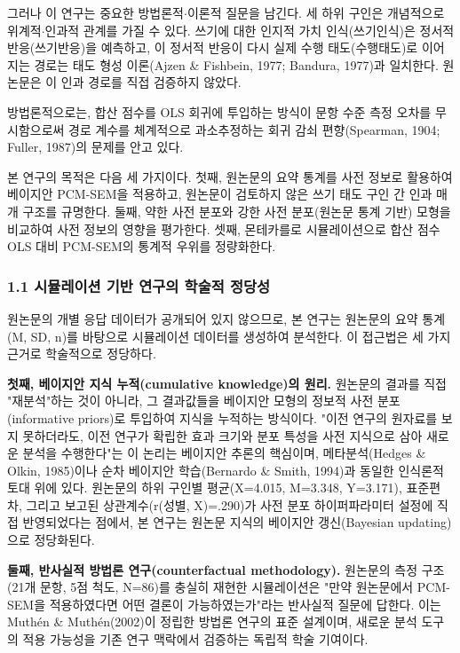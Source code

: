 \documentclass[a4paper,10pt]{oblivoir}
\begin{document}
그러나 이 연구는 중요한 방법론적\ensuremath{\cdot}이론적 질문을 남긴다. 세 하위 구인은 개념적으로 위계적\ensuremath{\cdot}인과적 관계를 가질 수 있다. 쓰기에 대한 인지적 가치 인식(쓰기인식)은 정서적 반응(쓰기반응)을 예측하고, 이 정서적 반응이 다시 실제 수행 태도(수행태도)로 이어지는 경로는 태도 형성 이론(Ajzen \& Fishbein, 1977; Bandura, 1977)과 일치한다. 원논문은 이 인과 경로를 직접 검증하지 않았다.

방법론적으로는, 합산 점수를 OLS 회귀에 투입하는 방식이 문항 수준 측정 오차를 무시함으로써 경로 계수를 체계적으로 과소추정하는 회귀 감쇠 편향(Spearman, 1904; Fuller, 1987)의 문제를 안고 있다.

본 연구의 목적은 다음 세 가지이다. 첫째, 원논문의 요약 통계를 사전 정보로 활용하여 베이지안 PCM-SEM을 적용하고, 원논문이 검토하지 않은 쓰기 태도 구인 간 인과 매개 구조를 규명한다. 둘째, 약한 사전 분포와 강한 사전 분포(원논문 통계 기반) 모형을 비교하여 사전 정보의 영향을 평가한다. 셋째, 몬테카를로 시뮬레이션으로 합산 점수 OLS 대비 PCM-SEM의 통계적 우위를 정량화한다.

\subsubsection{1.1 시뮬레이션 기반 연구의 학술적 정당성}

원논문의 개별 응답 데이터가 공개되어 있지 않으므로, 본 연구는 원논문의 요약 통계(M, SD, n)를 바탕으로 시뮬레이션 데이터를 생성하여 분석한다. 이 접근법은 세 가지 근거로 학술적으로 정당하다.

\textbf{첫째, 베이지안 지식 누적(cumulative knowledge)의 원리.} 원논문의 결과를 직접 "재분석"하는 것이 아니라, 그 결과값들을 베이지안 모형의 정보적 사전 분포(informative priors)로 투입하여 지식을 누적하는 방식이다. "이전 연구의 원자료를 보지 못하더라도, 이전 연구가 확립한 효과 크기와 분포 특성을 사전 지식으로 삼아 새로운 분석을 수행한다"는 이 논리는 베이지안 추론의 핵심이며, 메타분석(Hedges \& Olkin, 1985)이나 순차 베이지안 학습(Bernardo \& Smith, 1994)과 동일한 인식론적 토대 위에 있다. 원논문의 하위 구인별 평균(X=4.015, M=3.348, Y=3.171), 표준편차, 그리고 보고된 상관계수(r(성별, X)=.290)가 사전 분포 하이퍼파라미터 설정에 직접 반영되었다는 점에서, 본 연구는 원논문 지식의 베이지안 갱신(Bayesian updating)으로 정당화된다.

\textbf{둘째, 반사실적 방법론 연구(counterfactual methodology).} 원논문의 측정 구조(21개 문항, 5점 척도, N=86)를 충실히 재현한 시뮬레이션은 "만약 원논문에서 PCM-SEM을 적용하였다면 어떤 결론이 가능하였는가"라는 반사실적 질문에 답한다. 이는 Muthén \& Muthén(2002)이 정립한 방법론 연구의 표준 설계이며, 새로운 분석 도구의 적용 가능성을 기존 연구 맥락에서 검증하는 독립적 학술 기여이다.
\end{document}
